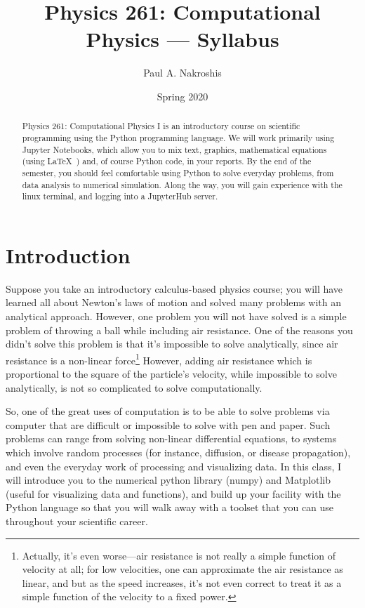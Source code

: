 \documentclass[justified]{tufte-handout}
\title{Physics 261: Computational Physics --- Syllabus}
\author[Paul A. Nakroshis]{Paul A. Nakroshis}
\date{Spring 2020}  %
\begin{document}
\maketitle%

\begin{abstract}
\noindent Physics 261: Computational Physics I is an introductory course on
scientific programming using the Python programming language. We will work primarily 
using Jupyter Notebooks, which allow you to mix text, graphics, mathematical equations (using
 \LaTeX\ ) and, of course Python code, in your reports.  By the 
end of the semester, you should feel comfortable using Python to solve everyday 
problems, from data analysis to numerical simulation. Along the way, you will gain experience
with the linux terminal, and logging into a JupyterHub server. 
 \end{abstract}

\section{Introduction}\label{sec:page-layout}
Suppose you take an introductory calculus-based physics course; you will 
have learned all about Newton's laws of motion and solved many problems
with an analytical approach. However, one problem you will not have solved
is a simple problem of throwing a ball while including air resistance. One of the reasons 
you didn't solve this problem is that it's impossible to solve analytically, since air resistance is 
a non-linear force\footnote{Actually, it's even worse---air resistance is not really a simple function of velocity at all; for low velocities, one can approximate the air resistance as linear, and but as the speed increases, it's not even correct to treat it as a simple function of the velocity to a fixed power.} However, adding air resistance which is proportional to the square of the particle's velocity, while impossible to solve analytically, is not so complicated to solve computationally. 

So, one of the great uses of computation is to be able to solve problems 
via computer that are difficult or impossible to solve with pen and paper.
Such problems can range from solving non-linear differential equations, to
systems which involve random processes (for instance,
diffusion, or disease propagation), and even the everyday work of processing and visualizing data.
In this class, I will introduce you to the numerical python library 
(numpy) and Matplotlib (useful for visualizing data and functions), and build up your 
facility with the Python language so that you will walk away with a toolset that you can
use throughout your scientific career. 
\end{document}
